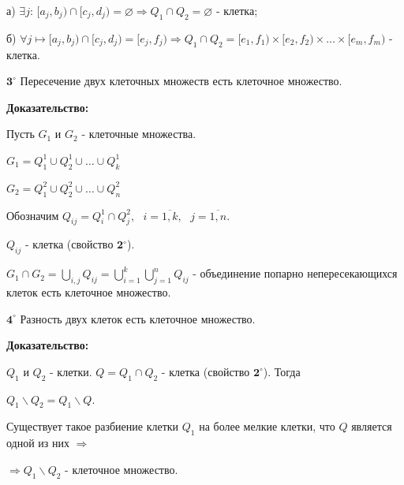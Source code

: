 \documentclass[a4paper,12pt]{article} %
\begin{document}
а) $\exists j$: $[a_j, b_j) \cap [c_j, d_j) = \varnothing \Rightarrow Q_1 \cap Q_2 = \varnothing $ - клетка;

б) $\forall j \longmapsto [a_j, b_j) \cap [c_j, d_j) = [e_j, f_j) \Rightarrow Q_1 \cap Q_2 = [e_1, f_1) \times [e_2, f_2) \times \ldots \times [e_m, f_m)$ - клетка.

\vspace{5mm}

$\textbf{3}^\circ$ Пересечение двух клеточных множеств есть клеточное множество.

\textbf{Доказательство:}

Пусть $G_1$ и $G_2$ - клеточные множества.

$G_1 = Q_1^1 \cup Q_2^1 \cup \ldots \cup Q_k^1$

$G_2 = Q_1^2 \cup Q_2^2 \cup \ldots \cup Q_n^2$

Обозначим $Q_{ij} = Q_i^1 \cap Q_j^2, \text{ } i = \overline{1, k}, \text{ } j = \overline{1, n}.$

$Q_{ij}$ - клетка (свойство $\textbf{2}^\circ$).

$G_1 \cap G_2 = \bigcup\limits_{i, j} Q_{ij} = \bigcup\limits_{i = 1}^k \bigcup\limits_{j = 1}^n Q_{ij}$ - объединение попарно непересекающихся клеток есть клеточное множество.

\vspace{5mm}

$\textbf{4}^\circ$ Разность двух клеток есть клеточное множество.

\textbf{Доказательство:}

$Q_1$ и $Q_2$ - клетки. $Q = Q_1 \cap Q_2$ - клетка (свойство $\textbf{2}^\circ$). Тогда

$Q_1 \backslash Q_2 = Q_1 \backslash Q$.

Существует такое разбиение клетки $Q_1$ на более мелкие клетки, что $Q$ является одной из них $\Rightarrow$

$\Rightarrow Q_1 \backslash Q_2$ - клеточное множество.
\end{document}
